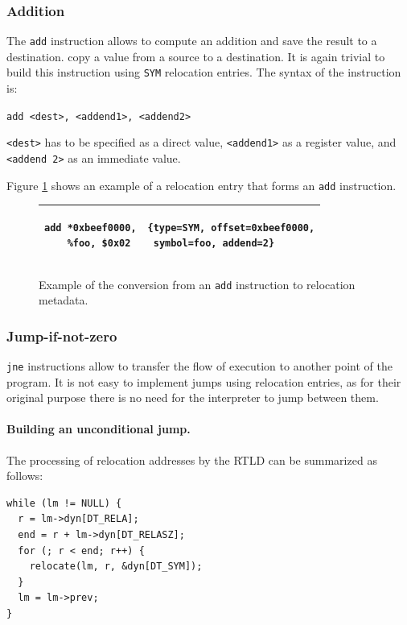 \documentclass[11pt,twoside,a4paper]{article}
\begin{document}
\subsubsection{Addition}
The \texttt{add} instruction allows to compute an addition and save the result to a destination. copy a value from a source to a destination. It is again trivial to build this instruction using \texttt{SYM} relocation entries. The syntax of the instruction is:

\texttt{add <dest>, <addend1>, <addend2>}

\texttt{<dest>} has to be specified as a direct value, \texttt{<addend1>} as a register value, and \texttt{<addend 2>} as an immediate value.

Figure \ref{add_table} shows an example of a relocation entry that forms an \texttt{add} instruction.

\begin{figure}[ht]
\centering
\begin{tabular}{ l | l }
  \hline
  \begin{lstlisting}
add *0xbeef0000,
    %foo, $0x02
  \end{lstlisting}
  &
  \begin{lstlisting}
{type=SYM, offset=0xbeef0000,
 symbol=foo, addend=2}
  \end{lstlisting} \\
  \hline
\end{tabular}
\caption{Example of the conversion from an \texttt{add} instruction to relocation metadata.}
\label{add_table}
\vspace{-0.4cm}
\end{figure}


\subsubsection{Jump-if-not-zero}
\texttt{jne} instructions allow to transfer the flow of execution to another point of the program. It is not easy to implement jumps using relocation entries, as for their original purpose there is no need for the interpreter to jump between them.

\paragraph{Building an unconditional jump.}
The processing of relocation addresses by the RTLD can be summarized as follows:
\begin{lstlisting}
while (lm != NULL) {
  r = lm->dyn[DT_RELA];
  end = r + lm->dyn[DT_RELASZ];
  for (; r < end; r++) {
    relocate(lm, r, &dyn[DT_SYM]);
  }
  lm = lm->prev;
}
\end{lstlisting}
\end{document}
